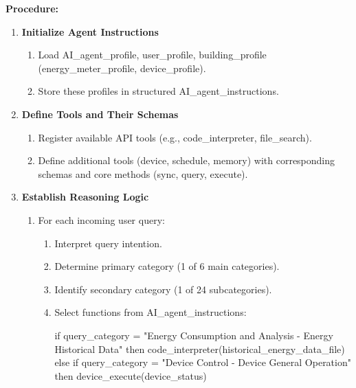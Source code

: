 \documentclass[final,3p,times]{elsarticle}
\begin{document}
\begin{algorithm}[htbp]
\caption{CONFIGURE\_BEMS\_AI\_AGENT}
\label{alg:configure_bems}
\begin{minipage}{0.92\linewidth}

\BlankLine
\textbf{Procedure:}

\begin{enumerate}
  \item \textbf{Initialize Agent Instructions}
    \begin{enumerate}
      \item Load AI\_agent\_profile, user\_profile, building\_profile (energy\_meter\_profile, device\_profile).
      \item Store these profiles in structured AI\_agent\_instructions.
    \end{enumerate}

  \item \textbf{Define Tools and Their Schemas}
    \begin{enumerate}
      \item Register available API tools (e.g., code\_interpreter, file\_search).
      \item Define additional tools (device, schedule, memory) with corresponding schemas and core methods (sync, query, execute).
    \end{enumerate}

  \item \textbf{Establish Reasoning Logic}
    \begin{enumerate}
      \item For each incoming user query:
        \begin{enumerate}
          \item Interpret query intention.
          \item Determine primary category (1 of 6 main categories).
          \item Identify secondary category (1 of 24 subcategories).
          \item Select functions from AI\_agent\_instructions:
          
            \Indp
                if query\_category = "Energy Consumption and Analysis - Energy Historical Data" then\;
                \Indp
                    code\_interpreter(historical\_energy\_data\_file)\;
                \Indm
                else if query\_category = "Device Control - Device General Operation" then\;
                \Indp
                    device\_execute(device\_status)\;
                \Indm


\end{enumerate}
\end{enumerate}
\end{enumerate}
\end{minipage}
\end{algorithm}
\end{document}
